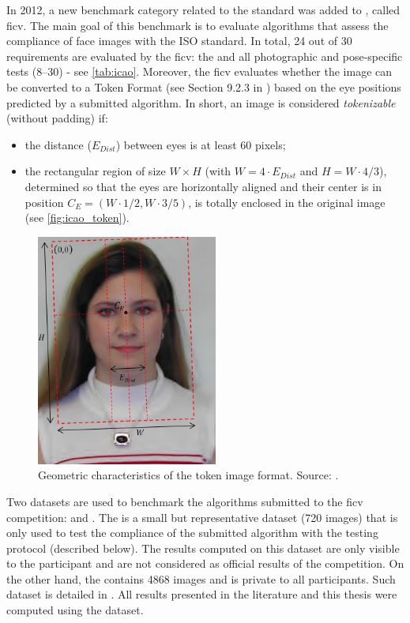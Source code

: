 In 2012, a new benchmark category related to the \icao standard was added to \fvcongoing \citep{ferrara2012face}, called \acf{ficv}. The main goal of this benchmark is to evaluate algorithms that assess the compliance of face images with the ISO standard. In total, 24 out of 30 requirements are evaluated by the \acs{ficv}: the \eyecenterlocation and all photographic and pose-specific tests (8--30) - see \autoref{tab:icao}. Moreover, the \acs{ficv} evaluates whether the image can be converted to a Token Format (see Section 9.2.3 in \citep{iso-iec}) based on the eye positions predicted by a submitted algorithm. In short, an image is considered \textit{tokenizable} (without padding) if:

\begin{itemize}
\item the distance ($E_{Dist}$) between eyes is at least 60 pixels;
\item the rectangular region of size $W \times H$ (with $W=4\cdot E_{Dist}$ and $H=W \cdot 4/3$), determined so that the eyes are horizontally aligned and their center is in position $C_E=(W\cdot1/2,W\cdot3/5)$, is totally enclosed in the original image (see \autoref{fig:icao_token}).
\end{itemize}

\begin{figure}[h]
    \centering
    \includegraphics[height=3.0in]{images/dataset/icao_tokenizable.png}
    \caption{Geometric characteristics of the token image format. Source: \citep{fvcongoing}.}
    \label{fig:icao_token}
\end{figure}

Two datasets are used to benchmark the algorithms submitted to the \acs{ficv} competition: \ficvtest and \ficvofficial. The \ficvtest is a small but representative dataset (720 images) that is only used to test the compliance of the submitted algorithm with the testing protocol (described below). The results computed on this dataset are only visible to the participant and are not considered as official results of the competition. On the other hand, the \ficvofficial contains 4868 images and is private to all participants. Such dataset is detailed in \cite{ferrara2012face}. All results presented in the literature and this thesis were computed using the \ficvofficial dataset.

